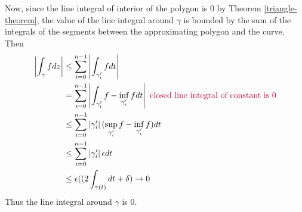 \documentclass{homework}
\begin{document}
\begin{solution}
                                                                                                                                                     Now, since the line integral of interior of the polygon is 0 by Theorem \ref{triangle-theorem}, the value of the line integral around $\gamma$ is bounded by the sum of the integrals of the segments between the approximating polygon and the curve. Then
                                                                                                                                                     \begin{align*}
                                                                                                                                                     \left|\int_{\gamma} fdz\right| &\leq \sum_{i=0}^{n-1}\left|\int_{\gamma_{i}'} f dt\right|\\
                                                                                                                                                     &= \sum_{i=0}^{n-1}\left|\int_{\gamma_{i}'} f - \inf_{\gamma_{i}'}f dt\right|\color{purple}\text{ closed line integral of constant is 0}\\
                                                                                                                                                     &\leq \sum_{i=0}^{n-1}\left|\gamma_{i}'\right|(\sup_{\gamma_{i}'}f - \inf_{\gamma_{i}'}f)  dt\\
                                                                                                                                                     &\leq \sum_{i=0}^{n-1}\left|\gamma_{i}'\right|\epsilon dt\\
                                                                                                                                                     &\leq \epsilon((2\int_{\gamma(t)}dt +\delta)\to 0
                                                                                                                                                     \end{align*}    
                                                                                                                                                     Thus the line integral around $\gamma$ is 0.
                                                                                                                                                      \end{solution} 
                                                                                                                                                       
\end{document}
